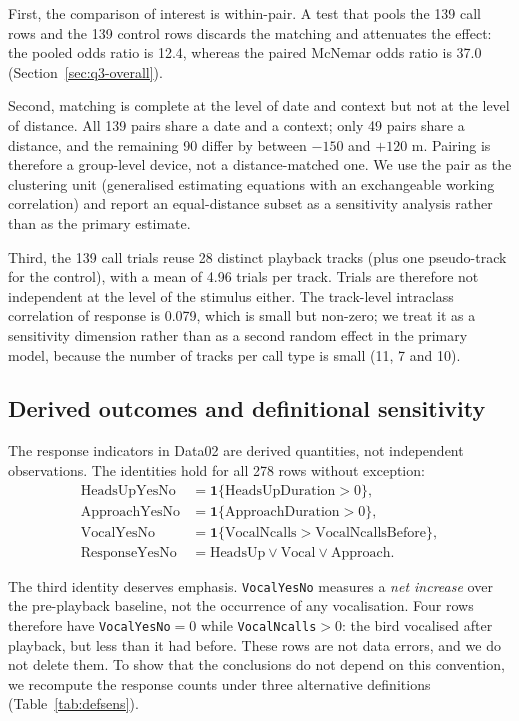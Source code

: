 First, the comparison of interest is within-pair. A test that pools the 139 call rows and the
139 control rows discards the matching and attenuates the effect: the pooled odds ratio is 12.4,
whereas the paired McNemar odds ratio is 37.0 (Section~\ref{sec:q3-overall}).

Second, matching is complete at the level of date and context but not at the level of distance.
All 139 pairs share a date and a context; only 49 pairs share a distance, and the remaining 90
differ by between $-150$ and $+120$ m. Pairing is therefore a group-level device, not a
distance-matched one. We use the pair as the clustering unit (generalised estimating equations
with an exchangeable working correlation) and report an equal-distance subset as a sensitivity
analysis rather than as the primary estimate.

Third, the 139 call trials reuse 28 distinct playback tracks (plus one pseudo-track for the
control), with a mean of 4.96 trials per track. Trials are therefore not independent at the level
of the stimulus either. The track-level intraclass correlation of response is 0.079, which is
small but non-zero; we treat it as a sensitivity dimension rather than as a second random effect
in the primary model, because the number of tracks per call type is small (11, 7 and 10).

\subsection{Derived outcomes and definitional sensitivity}\label{sec:derived}

The response indicators in Data02 are derived quantities, not independent observations. The
identities hold for all 278 rows without exception:
\begin{align}
  \text{HeadsUpYesNo} &= \mathbf{1}\{\text{HeadsUpDuration}>0\}, \\
  \text{ApproachYesNo} &= \mathbf{1}\{\text{ApproachDuration}>0\}, \\
  \text{VocalYesNo} &= \mathbf{1}\{\text{VocalNcalls}>\text{VocalNcallsBefore}\}, \\
  \text{ResponseYesNo} &= \text{HeadsUp} \lor \text{Vocal} \lor \text{Approach}.
\end{align}

The third identity deserves emphasis. \texttt{VocalYesNo} measures a \emph{net increase} over the
pre-playback baseline, not the occurrence of any vocalisation. Four rows therefore have
\texttt{VocalYesNo}$=0$ while \texttt{VocalNcalls}$>0$: the bird vocalised after playback, but
less than it had before. These rows are not data errors, and we do not delete them. To show that
the conclusions do not depend on this convention, we recompute the response counts under three
alternative definitions (Table~\ref{tab:defsens}).

